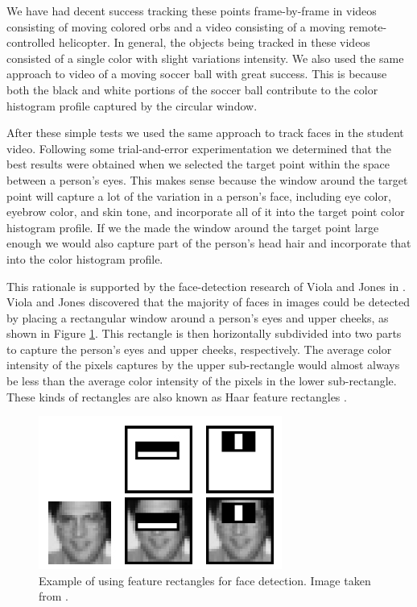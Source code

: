 \documentclass[11pt]{article}
\begin{document}
We have had decent success tracking these points frame-by-frame in videos consisting of moving colored orbs and a video consisting of a moving remote-controlled helicopter. In general, the objects being tracked in these videos consisted of a single color with slight variations intensity. We also used the same approach to video of a moving soccer ball with great success. This is because both the black and white portions of the soccer ball contribute to the color histogram profile captured by the circular window.

After these simple tests we used the same approach to track faces in the student video. Following some trial-and-error experimentation we determined that the best results were obtained when we selected the target point within the space between a person's eyes. This makes sense because the window around the target point will capture a lot of the variation in a person's face, including eye color, eyebrow color, and skin tone, and incorporate all of it into the target point color histogram profile. If we the made the window around the target point large enough we would also capture part of the person's head hair and incorporate that into the color histogram profile. 

This rationale is supported by the face-detection research of Viola and Jones in \cite{facedetection}. Viola and Jones discovered that the majority of faces in images could be detected by placing a rectangular window around a person's eyes and upper cheeks, as shown in Figure \ref{fig:facedetection}. This rectangle is then horizontally subdivided into two parts to capture the person's eyes and upper cheeks, respectively. The average color intensity of the pixels captures by the upper sub-rectangle would almost always be less than the average color intensity of the pixels in the lower sub-rectangle. These kinds of rectangles are also known as Haar feature rectangles \cite{haar}.


\begin{figure}[H]
\centering
\includegraphics[scale=.55]{img/facedetection.jpg}
\caption{Example of using feature rectangles for face detection. Image taken from \cite{facedetection}.}
\label{fig:facedetection}
\end{figure}
\end{document}
